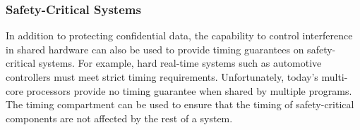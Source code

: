 \subsubsection{Safety-Critical Systems}

In addition to protecting confidential data, the capability to control interference
in shared hardware can also be used to provide timing guarantees on safety-critical systems.
For example, hard real-time systems such as automotive controllers must meet
strict timing requirements. Unfortunately, today's multi-core processors provide
no timing guarantee when shared by multiple programs. The timing compartment can be
used to ensure that the timing of safety-critical components are not affected by
the rest of a system.

